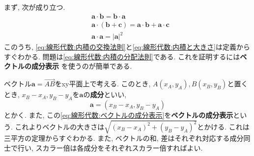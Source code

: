 \documentclass[a4j,dvipdfmx]{jsarticle}
\numberwithin{equation}{section}
\begin{document}
            まず, 次が成り立つ.
            \begin{align}
                &\bm{a}\cdot\bm{b}=\bm{b}\cdot\bm{a} \label{eq:線形代数:内積の交換法則}\\
                &\bm{a}\cdot(\bm{b}+\bm{c})=\bm{a}\cdot\bm{b}+\bm{a}\cdot\bm{c} \label{eq:線形代数:内積の分配法則}\\
                &\bm{a}\cdot\bm{a}=|\bm{a}|^2 \label{eq:線形代数:内積と大きさ}
            \end{align}
            このうち, \eqref{eq:線形代数:内積の交換法則}と\eqref{eq:線形代数:内積と大きさ}は定義からすぐわかる. 問題は\eqref{eq:線形代数:内積の分配法則}である. これを証明するには\textbf{ベクトルの成分表示}
            を使うのが簡単である.

            ベクトル$\bm{a}=\overrightarrow{AB}$をxy平面上で考える. このとき, $A(x_A,y_A),B(x_B,y_B)$と置くとき, $x_B-x_A,y_B-y_A$を$\bm{a}$の\textbf{成分}といい, 
            \begin{equation}
                \bm{a}=(x_B-x_A,y_B-y_A) \label{eq:線形代数:ベクトルの成分表示}
            \end{equation}
            とかく. また, この\eqref{eq:線形代数:ベクトルの成分表示}を\textbf{ベクトルの成分表示}という. これよりベクトルの大きさは$\sqrt{(x_B-x_A)^2+(y_B-y_A)^2}$とかける. これは三平方の定理からすぐわかる.
            また, ベクトルの和, 差はそれぞれ対応する成分同士で行い, スカラー倍は各成分をそれぞれスカラー倍すればよい.
\end{document}

